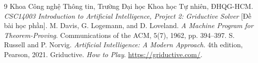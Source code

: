 \documentclass[12pt,a4paper]{article}
\begin{document}
\clearpage
{}
{}
\begin{thebibliography}{9}
 Khoa Công nghệ Thông tin, Trường Đại học Khoa học Tự nhiên, ĐHQG-HCM. \textit{CSC14003 Introduction to Artificial Intelligence, Project 2: Griductive Solver} [Đề bài học phần].
 M. Davis, G. Logemann, and D. Loveland. \textit{A Machine Program for Theorem-Proving}. Communications of the ACM, 5(7), 1962, pp. 394--397.
 S. Russell and P. Norvig. \textit{Artificial Intelligence: A Modern Approach}. 4th edition, Pearson, 2021.
 Griductive. \textit{How to Play}. \url{https://griductive.com/}.
\end{thebibliography}

\appendix

\end{document}
